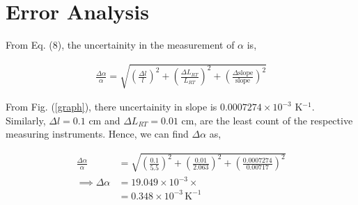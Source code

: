 \section{Error Analysis}

From Eq. (8), the uncertainity in the measurement of $\alpha$ is,

\begin{align}
    \frac{\Delta \alpha}{\alpha} = \sqrt{\left(\frac{\Delta l}{l}\right)^2 + \left(\frac{\Delta L_{RT}}{L_{RT}}\right)^2 + \left(\frac{\Delta \text{slope}}{\text{slope}}\right)^2}
\end{align}

From Fig. (\ref{graph}), there uncertainity in slope is $0.0007274 \times 10^{-3}$ K$^{-1}$. Similarly, $\Delta l = 0.1$ cm and $\Delta L_{RT} = 0.01$ cm, are the least count of the respective measuring instruments. Hence, we can find $\Delta \alpha$ as,

\begin{align*}
    \frac{\Delta \alpha}{\alpha} &= \sqrt{\left(\frac{0.1}{5.5}\right)^2 + \left(\frac{0.01}{2.063}\right)^2 + \left(\frac{0.0007274}{\text{0.00717}}\right)^2}\\
    \implies \Delta \alpha &= 19.049 \times 10^{-3} \times \\
    &= 0.348 \times 10^{-3}\,\text{K}^{-1} 
\end{align*}